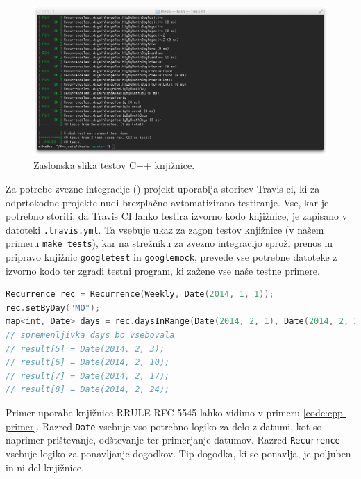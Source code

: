 \begin{figure}
 \includegraphics[width=\linewidth]{cpp-tests}
 \caption{Zaslonska slika testov C++ knjižnice.}
 \label{fig:cpp-tests}
\end{figure}

Za potrebe zvezne integracije () projekt uporablja storitev Travis \gls{ci}\cite{travisci}, ki za odprtokodne projekte nudi brezplačno avtomatizirano testiranje. Vse, kar je potrebno storiti, da Travis CI lahko testira izvorno kodo knjižnice, je zapisano v datoteki \texttt{.travis.yml}. Ta vsebuje ukaz za zagon testov knjižnice (v našem primeru \texttt{make tests}), kar na strežniku za zvezno integracijo sproži prenos in pripravo knjižnic \texttt{googletest} in \texttt{googlemock}, prevede vse potrebne datoteke z izvorno kodo ter zgradi testni program, ki zažene vse naše testne primere.

\begin{lstlisting}[caption={Primer uporabe C++ knjižnice RRULE standarda RFC 5545. Izbrani dogodek bi se s tem pravilom ponavljal tedensko, vsak ponedeljek, od 1. januarja 2014 naprej.}, label=code:cpp-primer, language=C++]
Recurrence rec = Recurrence(Weekly, Date(2014, 1, 1));
rec.setByDay("MO");
map<int, Date> days = rec.daysInRange(Date(2014, 2, 1), Date(2014, 2, 28));
// spremenljivka days bo vsebovala
// result[5] = Date(2014, 2, 3);
// result[6] = Date(2014, 2, 10);
// result[7] = Date(2014, 2, 17);
// result[8] = Date(2014, 2, 24);
\end{lstlisting}

Primer uporabe knjižnice RRULE RFC 5545 lahko vidimo v primeru \ref{code:cpp-primer}. Razred \texttt{Date} vsebuje vso potrebno logiko za delo z datumi, kot so naprimer prištevanje, odštevanje ter primerjanje datumov. Razred \texttt{Recurrence} vsebuje logiko za ponavljanje dogodkov. Tip dogodka, ki se ponavlja, je poljuben in ni del knjižnice.

